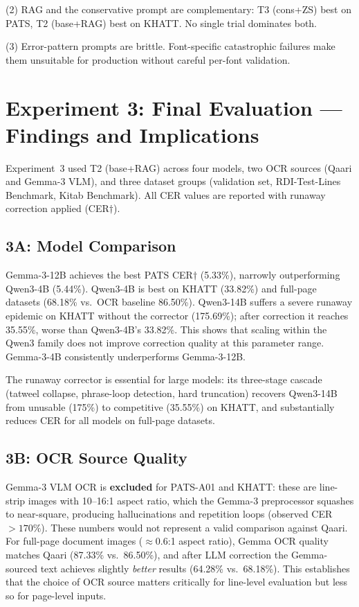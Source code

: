 (2) RAG and the conservative prompt are complementary: T3 (cons+ZS) best
on PATS, T2 (base+RAG) best on KHATT. No single trial dominates both.

(3) Error-pattern prompts are brittle. Font-specific catastrophic failures
make them unsuitable for production without careful per-font validation.

\section{Experiment 3: Final Evaluation --- Findings and Implications}
\label{sec:disc_exp3}

Experiment~3 used T2 (base+RAG) across four models, two OCR sources
(Qaari and Gemma-3 VLM), and three dataset groups (validation set,
RDI-Test-Lines Benchmark, Kitab Benchmark). All CER values are reported with
runaway correction applied (CER$\dagger$).

\subsection*{3A: Model Comparison}

Gemma-3-12B achieves the best PATS CER$\dagger$ (5.33\%), narrowly
outperforming Qwen3-4B (5.44\%). Qwen3-4B is best on KHATT (33.82\%)
and full-page datasets (68.18\% vs.\ OCR baseline 86.50\%). Qwen3-14B
suffers a severe runaway epidemic on KHATT without the corrector
(175.69\%); after correction it reaches 35.55\%, worse than Qwen3-4B's
33.82\%. This shows that scaling within the Qwen3 family does not improve
correction quality at this parameter range. Gemma-3-4B consistently
underperforms Gemma-3-12B.

The runaway corrector is essential for large models: its three-stage cascade
(tatweel collapse, phrase-loop detection, hard truncation) recovers Qwen3-14B
from unusable (175\%) to competitive (35.55\%) on KHATT, and substantially
reduces CER for all models on full-page datasets.

\subsection*{3B: OCR Source Quality}

Gemma-3 VLM OCR is \textbf{excluded} for PATS-A01 and KHATT: these are
line-strip images with 10--16:1 aspect ratio, which the Gemma-3 preprocessor
squashes to near-square, producing hallucinations and repetition loops
(observed CER $>170\%$). These numbers would not represent a valid
comparison against Qaari. For full-page document images ($\approx 0.6$:1
aspect ratio), Gemma OCR quality matches Qaari (87.33\% vs.\ 86.50\%),
and after LLM correction the Gemma-sourced text achieves slightly
\emph{better} results (64.28\% vs.\ 68.18\%). This establishes that the
choice of OCR source matters critically for line-level evaluation but less
so for page-level inputs.

